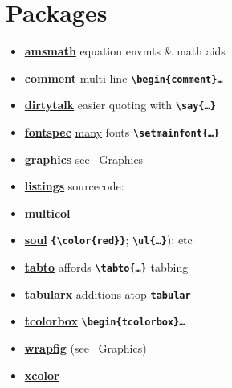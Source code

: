\section{Packages}


\begin{itemize}[label=-,leftmargin=*]
    \item \textbf{\href{http://mirrors.ctan.org/macros/latex/required/amsmath/amsldoc.pdf}{amsmath}} \tabto*{15mm} equation envmts \& math aids
    \item \textbf{\href{http://mirrors.ctan.org/macros/latex/contrib/comment/comment.pdf}{comment}} \tabto*{15mm} multi-line {\tt\bf \textbackslash begin\{comment\}\dots}
    \item \textbf{\href{http://mirrors.ctan.org/macros/latex/contrib/dirtytalk/dirtytalk.pdf}{dirtytalk}} \tabto*{15mm} easier quoting with {\tt\bf \textbackslash say\{\dots\}}
    \item \textbf{\href{http://mirrors.ctan.org/macros/unicodetex/latex/fontspec/fontspec.pdf}{fontspec}} \tabto*{15mm} \href{https://tug.org/FontCatalogue/}{\ul{many}} fonts {\tt\bf\textbackslash setmainfont\{\dots\}}
    \item \textbf{\href{http://mirrors.ctan.org/macros/latex/required/graphics/graphics.pdf}{graphics}} \tabto*{15mm} see \textsection\ Graphics
    \item \textbf{\href{http://mirrors.ctan.org/macros/latex/contrib/listings/listings.pdf}{listings}} \tabto*{15mm} sourcecode: 
    \item \textbf{\href{http://mirrors.ctan.org/macros/latex/required/tools/multicol.pdf}{multicol}} \tabto*{15mm} 
    \item \textbf{\href{http://mirrors.ctan.org/macros/generic/soul/soul.pdf}{soul}} \tabto*{15mm} {\tt\bf \{\textbackslash color\{red\}\}}; {\tt\bf \textbackslash ul\{\dots\}}); etc
    \item \textbf{\href{http://mirrors.ctan.org/macros/latex/contrib/tabto/tabto-doc.pdf}{tabto}} \tabto*{15mm} affords {\tt\bf \textbackslash tabto\{\dots\}} tabbing
    \item \textbf{\href{http://mirrors.ctan.org/macros/latex/required/tools/tabularx.pdf}{tabularx}} \tabto*{15mm} additions atop {\tt\bf tabular}
    \item \textbf{\href{https://www.overleaf.com/latex/examples/drawing-coloured-boxes-using-tcolorbox/pvknncpjyfbp}{tcolorbox}} \tabto*{15mm} {\tt\bf\textbackslash begin\{tcolorbox\}\dots} 
    \item \textbf{\href{http://mirrors.ctan.org/macros/latex/contrib/wrapfig/wrapfig-doc.pdf}{wrapfig}} \tabto*{15mm} (see \textsection\ Graphics)
    \item \textbf{\href{http://mirrors.ctan.org/macros/latex/contrib/xcolor/xcolor.pdf}{xcolor}} \tabto*{15mm} 
\end{itemize}


